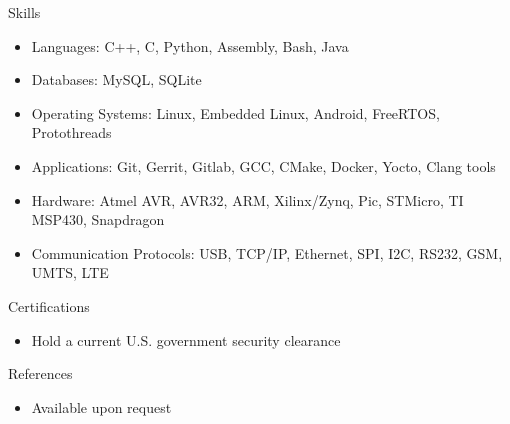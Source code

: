 \documentclass[10pt,oneside]{article}
\newenvironment{ressection}[1]{
  \vspace{-2pt}
  {\fontfamily{cmr}\selectfont\Large#1}
  \begin{itemize}
  \vspace{-1pt}
}{
  \end{itemize}
}
\newcommand{\resitem}[1]{
  \vspace{-4pt}
  \item \begin{flushleft} #1 \end{flushleft}
}
\begin{document}
%
%
%


\begin{ressection}{Skills}
  \resitem{Languages: C++, C, Python, Assembly, Bash, Java}
  \resitem{Databases: MySQL, SQLite}
  \resitem{Operating Systems: Linux, Embedded Linux, Android, FreeRTOS, Protothreads}
  \resitem{Applications: Git, Gerrit, Gitlab, GCC, CMake, Docker, Yocto, Clang tools}
  \resitem{Hardware: Atmel AVR, AVR32, ARM, Xilinx/Zynq, Pic, STMicro, TI MSP430, Snapdragon}
  \resitem{Communication Protocols: USB, TCP/IP, Ethernet, SPI, I2C, RS232, GSM, UMTS, LTE}
\end{ressection}

\begin{ressection}{Certifications}
  \resitem{Hold a current U.S. government security clearance}
\end{ressection}

%
%

\begin{ressection}{References}
  \resitem{Available upon request}
\end{ressection}
\end{document}
